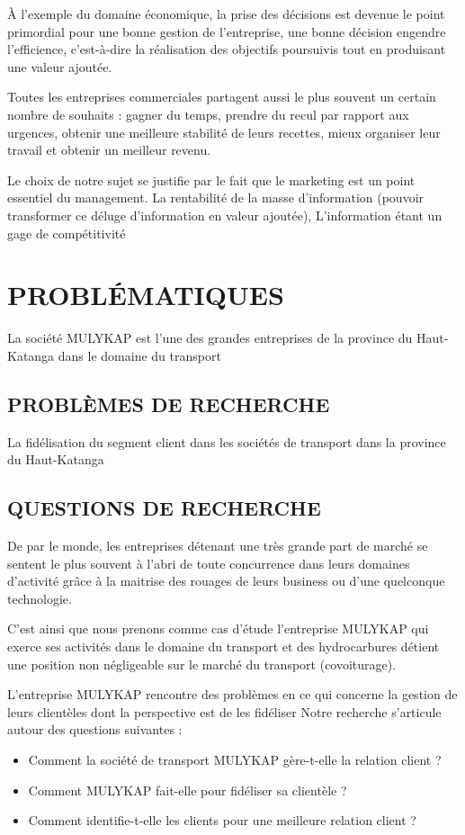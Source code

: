 \documentclass[a4paper,12pt,oneside]{book}
\begin{document}
À l’exemple du domaine
économique, la prise des décisions est devenue
le point primordial pour une bonne gestion de
l’entreprise, une bonne décision engendre l’efficience,
c’est-à-dire la réalisation des objectifs
poursuivis tout en produisant une valeur ajoutée.
\newline

Toutes les entreprises commerciales partagent aussi
le plus souvent un certain nombre de souhaits : gagner
du temps, prendre du recul par rapport aux urgences, obtenir une meilleure
stabilité de leurs recettes, mieux organiser leur travail et obtenir un meilleur
revenu. \cite*{Barouch2010}
\newline

Le choix de notre sujet se justifie par le fait que le marketing 
est un point essentiel du management.
La rentabilité de la masse d’information (pouvoir transformer
ce déluge d’information en valeur ajoutée), L’information étant
un gage de compétitivité %

\section[Problématique]{PROBLÉMATIQUES}
La société MULYKAP est l’une des grandes entreprises
de la province du Haut-Katanga dans le domaine du transport
\subsection[Problèmes de recherche]{PROBLÈMES DE RECHERCHE}
La fidélisation du segment client dans les sociétés de transport
dans la province du Haut-Katanga

\subsection[Questions de recherche]{QUESTIONS DE RECHERCHE}
De par le monde, les entreprises détenant une très grande part de marché
se sentent le plus souvent à l’abri de toute concurrence dans leurs domaines d’activité
grâce à la maitrise des rouages de leurs business ou
d’une quelconque technologie. \cite*{Rouviere2010} 

C’est ainsi que nous prenons comme cas d’étude l’entreprise MULYKAP qui exerce ses activités dans le domaine 
du transport et des hydrocarbures détient
une position non négligeable sur le marché du transport (covoiturage). \cite{Rouviere2010}

L’entreprise MULYKAP rencontre des problèmes en ce qui concerne
la gestion de leurs clientèles dont la perspective est de les 
fidéliser 
Notre recherche s’articule autour des questions suivantes : 
\begin{itemize}
    \item Comment la société de transport MULYKAP gère-t-elle
    la relation client ?
    \item Comment MULYKAP fait-elle pour fidéliser sa clientèle ?
    \item Comment identifie-t-elle les clients pour une
    meilleure relation client ?
\end{itemize}
\end{document}
